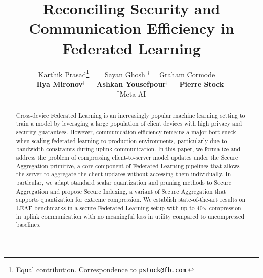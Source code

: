 \documentclass{article}
\title{Reconciling Security and Communication Efficiency in Federated Learning}
\author{
Karthik Prasad\thanks{Equal contribution. Correspondence to \texttt{pstock@fb.com}.} $^{~\dagger}$~~ Sayan Ghosh\footnotemark[1]$^{~~\dagger}$~~ Graham Cormode$^\dagger$~~ \\ \textbf{Ilya Mironov$^\dagger$~~ Ashkan Yousefpour$^\dagger$~~ Pierre Stock$^\dagger$} \\ $^\dagger$Meta AI
}
\newcommand{\karthik}[1]{{\color{blue}Karthik: #1}}
\begin{document}
\maketitle 

\begin{abstract}

Cross-device Federated Learning is an increasingly popular machine learning setting to train a model by leveraging 
a large population of client devices with high privacy and security guarantees. 
However, 
communication efficiency remains a major bottleneck when scaling federated learning to production environments, particularly due to bandwidth constraints during uplink communication.
In this paper, we formalize and address the problem of compressing client-to-server model updates
under the Secure Aggregation primitive, a core component of Federated Learning pipelines that allows the server to aggregate the client updates without accessing them individually. 
In particular, we adapt standard scalar quantization and pruning methods
to Secure Aggregation and propose Secure Indexing, a variant of Secure Aggregation that supports quantization for extreme compression.
We establish state-of-the-art results on LEAF benchmarks in a secure Federated Learning setup with up to 40$\times$ compression in uplink communication 
with no meaningful loss in utility compared to uncompressed baselines.
\end{abstract}














\end{document}
